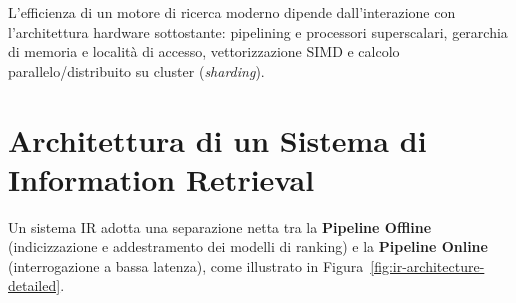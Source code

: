 L'efficienza di un motore di ricerca moderno dipende dall'interazione con l'architettura hardware sottostante: pipelining e processori superscalari, gerarchia di memoria e localit\`a di accesso, vettorizzazione SIMD e calcolo parallelo/distribuito su cluster (\textit{sharding}).

\FloatBarrier
\section{Architettura di un Sistema di Information Retrieval}
\label{sec:architettura-sistema-ir-intro}

Un sistema IR adotta una separazione netta tra la \textbf{Pipeline Offline} (indicizzazione e addestramento dei modelli di ranking) e la \textbf{Pipeline Online} (interrogazione a bassa latenza), come illustrato in Figura~\ref{fig:ir-architecture-detailed}.

